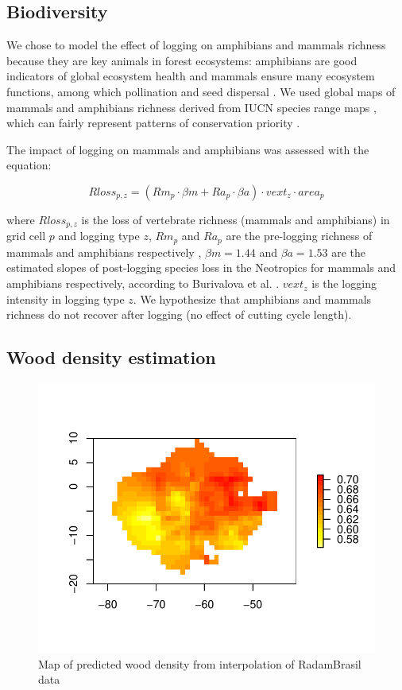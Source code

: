 \documentclass{article}
\begin{document}
\subsection{Biodiversity}

We chose to model the effect of logging on amphibians and mammals richness because they are key animals in forest ecosystems: amphibians are good indicators of global ecosystem health \cite{Welsh1998,Collins2003} and mammals ensure many ecosystem functions, among which pollination \cite{Fleming2009} and seed dispersal \cite{Wright2000,Muscarella2007}. We used global maps of mammals and amphibians richness derived from IUCN species range maps \cite{Jenkins2013,MapBiodiv}, which can fairly represent patterns of conservation priority \cite{Marechaux2017}.

The impact of logging on mammals and amphibians was assessed with the equation: 

\begin{equation}
\label{eq:rloss}
Rloss_{p,z} = \left(Rm_{p} \cdot \beta m + Ra_{p} \cdot \beta a  \right)  \cdot vext_z \cdot area_p 
\end{equation}

where $Rloss_{p,z}$ is the loss of vertebrate richness (mammals and amphibians) in grid cell $p$ and logging type $z$, $Rm_{p}$ and $Ra_p$ are the pre-logging richness of mammals and amphibians respectively \cite{Jenkins2013}, $\beta m = 1.44$ and $\beta a = 1.53$  are the estimated slopes of post-logging species loss in the Neotropics for mammals and amphibians respectively, according to Burivalova et al.  \cite{Burivalova2014}. $vext_z$ is the logging intensity in logging type $z$.
We hypothesize that amphibians and mammals richness do not recover after logging (no effect of cutting cycle length). 

\subsection{Wood density estimation}
\label{supmat:wdext}

\begin{figure}
    \centering
    \includegraphics[width=0.7\linewidth]{graphs/map_WDext.pdf}
    \caption{Map of predicted wood density from interpolation of RadamBrasil data}
    \label{sfig:wdext}
\end{figure}
\end{document}
